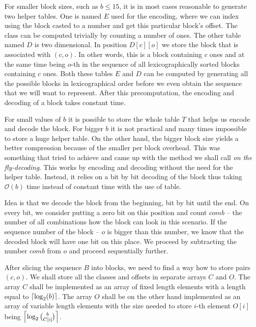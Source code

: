 For smaller block sizes, such as $b\leq 15$, it is in most cases reasonable to
generate two helper tables. One is named $E$ used for the encoding, where we can
index using the block casted to a number and get this particular block's offset.
The class can be computed trivially by counting a number of ones. The other table
named $D$ is two dimensional. In position $D[c][o]$ we store the block that
is associated with $(c, o)$. In other words, this is a block containing $c$ ones
and at the same time being $o$-th in the sequence of all lexicographically sorted
blocks containing $c$ ones. Both these tables $E$ and $D$ can be computed
by generating all the possible blocks in lexicographical order before we even
obtain the sequence that we will want to represent. After this precomputation,
the encoding and decoding of a block takes constant time.

For small values of $b$ it is possible to store the whole table $T$ that helps us
encode and decode the block. For bigger $b$ it is not practical and many times
impossible to store a huge helper table. On the other hand, the bigger block size
yields a better compression because of the smaller per block overhead. This was
something that \cite{navarro2012fast} tried to achieve and came up with the method
we shall call \textit{on the fly-decoding}. This works by encoding and decoding without
the need for the helper table. Instead, it relies on a bit by bit decoding of the block
thus taking $\mathcal{O}(b)$ time instead of constant time with the use of table.

Idea is that we decode the block from the beginning, bit by bit until the end. On every bit,
we consider putting a zero bit on this position and count $comb$ -- the number of all
combinations how the block can look in this scenario. If the sequence number of the block --
$o$ is bigger than this number, we know that the decoded block will have one bit on this place.
We proceed by subtracting the number $comb$ from $o$ and proceed sequentially further.

After slicing the sequence $B$ into blocks, we need to find a way how to store pairs $(c, o)$.
We shall store all the classes and offsets in separate arrays $C$ and $O$. The array $C$ shall
be implemented as an array of fixed length elements with a length equal to
$\left\lceil \log_2(b) \right\rceil$. The array $O$ shall be on the other hand implemented as an array of
variable length elements with the size needed to store $i$-th element $O[i]$ being
$\left\lceil \log_2{b\choose C[i]} \right\rceil$.


